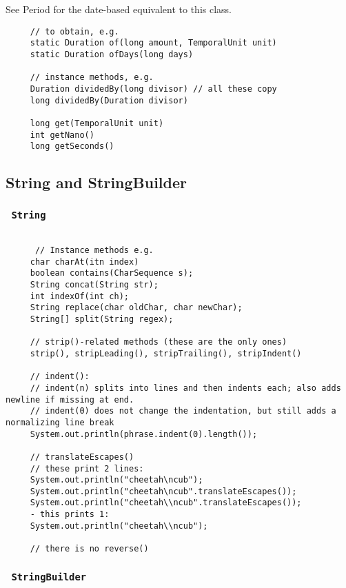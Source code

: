 \documentclass{scrartcl}
\begin{document}
    See Period for the date-based equivalent to this class.

     \begin{lstlisting}
     // to obtain, e.g.
     static Duration of(long amount, TemporalUnit unit)
     static Duration ofDays(long days)

     // instance methods, e.g.
     Duration dividedBy(long divisor) // all these copy
     long dividedBy(Duration divisor)

     long get(TemporalUnit unit)
     int getNano()
     long getSeconds()
     \end{lstlisting}

 \subsection{String and StringBuilder}
 \subsubsection{\lstinline$ String $}

    \begin{lstlisting}

      // Instance methods e.g.
     char charAt(itn index)
     boolean contains(CharSequence s);
     String concat(String str);
     int indexOf(int ch);
     String replace(char oldChar, char newChar);
     String[] split(String regex);

     // strip()-related methods (these are the only ones)
     strip(), stripLeading(), stripTrailing(), stripIndent()

     // indent():
     // indent(n) splits into lines and then indents each; also adds newline if missing at end.
     // indent(0) does not change the indentation, but still adds a normalizing line break
     System.out.println(phrase.indent(0).length());

     // translateEscapes()
     // these print 2 lines:
     System.out.println("cheetah\ncub");
     System.out.println("cheetah\ncub".translateEscapes());
     System.out.println("cheetah\\ncub".translateEscapes());
     - this prints 1:
     System.out.println("cheetah\\ncub");

     // there is no reverse()
     \end{lstlisting}

 \subsubsection{\lstinline$ StringBuilder $}
\end{document}
